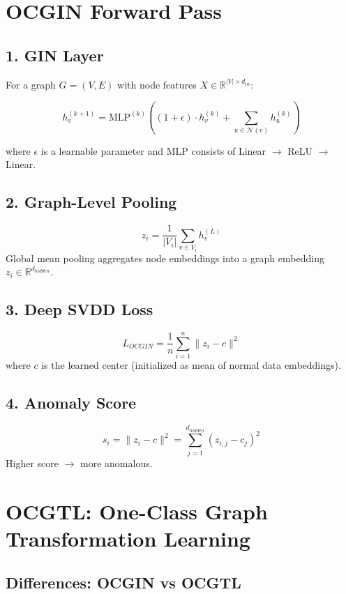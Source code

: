 \section{OCGIN Forward Pass}

\subsection{1. GIN Layer}
For a graph $G = (V, E)$ with node features $X \in \mathbb{R}^{|V| \times d_{in}}$:

\[
h_v^{(k+1)} = \text{MLP}^{(k)}\left( (1 + \epsilon) \cdot h_v^{(k)} + \sum_{u \in \mathcal{N}(v)} h_u^{(k)} \right)
\]

where $\epsilon$ is a learnable parameter and MLP consists of Linear $\rightarrow$ ReLU $\rightarrow$ Linear.

\subsection{2. Graph-Level Pooling}
\[
z_i = \frac{1}{|V_i|} \sum_{v \in V_i} h_v^{(L)}
\]
Global mean pooling aggregates node embeddings into a graph embedding $z_i \in \mathbb{R}^{d_{hidden}}$.

\subsection{3. Deep SVDD Loss}
\[
L_{OCGIN} = \frac{1}{n} \sum_{i=1}^{n} \| z_i - c \|^2
\]
where $c$ is the learned center (initialized as mean of normal data embeddings).

\subsection{4. Anomaly Score}
\[
s_i = \| z_i - c \|^2 = \sum_{j=1}^{d_{hidden}} (z_{i,j} - c_j)^2
\]
Higher score $\rightarrow$ more anomalous.


\section{OCGTL: One-Class Graph Transformation Learning}

\subsection{Differences: OCGIN vs OCGTL}

